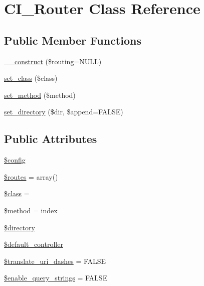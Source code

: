 \hypertarget{class_c_i___router}{}\section{C\+I\+\_\+\+Router Class Reference}
\label{class_c_i___router}
\subsection*{Public Member Functions}
\begin{DoxyCompactItemize}
\item 
\mbox{\hyperlink{class_c_i___router_a9b81050c9907794a374f5088743a0252}{\+\_\+\+\_\+construct}} (\$routing=N\+U\+LL)
\item 
\mbox{\hyperlink{class_c_i___router_afbb540df5c161fe69909a5f8182f910f}{set\+\_\+class}} (\$class)
\item 
\mbox{\hyperlink{class_c_i___router_a6a42036a115946acdaf0975c994106fb}{set\+\_\+method}} (\$method)
\item 
\mbox{\hyperlink{class_c_i___router_a80573f758526ffa1beba61be5d45baff}{set\+\_\+directory}} (\$dir, \$append=F\+A\+L\+SE)
\end{DoxyCompactItemize}
\subsection*{Public Attributes}
\begin{DoxyCompactItemize}
\item 
\mbox{\hyperlink{class_c_i___router_a49c7011be9c979d9174c52a8b83e5d8e}{\$config}}
\item 
\mbox{\hyperlink{class_c_i___router_a8f7eb04a54e0f0bfc0cedeb9899ce4a8}{\$routes}} = array()
\item 
\mbox{\hyperlink{class_c_i___router_a252ba022809910ea710a068fc1bab657}{\$class}} = \textquotesingle{}\textquotesingle{}
\item 
\mbox{\hyperlink{class_c_i___router_a12661b2fc0f57f97e30a1620889ce9c6}{\$method}} = \textquotesingle{}index\textquotesingle{}
\item 
\mbox{\hyperlink{class_c_i___router_a1b07c630eb02f770a082a013373a16d6}{\$directory}}
\item 
\mbox{\hyperlink{class_c_i___router_ab949cccd963058f0937d04bc26ee24a7}{\$default\+\_\+controller}}
\item 
\mbox{\hyperlink{class_c_i___router_a9693c124c7019ed8ec57166661044ba2}{\$translate\+\_\+uri\+\_\+dashes}} = F\+A\+L\+SE
\item 
\mbox{\hyperlink{class_c_i___router_a8495f59271097c83f7703d433d96ff6d}{\$enable\+\_\+query\+\_\+strings}} = F\+A\+L\+SE
\end{DoxyCompactItemize}
